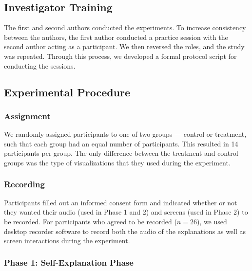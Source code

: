 \documentclass[conference]{IEEEtran}
\begin{document}
\subsection{Investigator Training}

The first and second authors conducted the experiments. To increase consistency between the authors, the first author conducted a practice session with the second author acting as a participant. We then reversed the roles, and the study was repeated. Through this process, we developed a formal protocol script for conducting the sessions.

\subsection{Experimental Procedure}


\subsubsection{Assignment}
We randomly assigned participants to one of two groups --- control or treatment, such that each group had an equal number of participants. This resulted in 14 participants per group. The only difference between the treatment and control groups was the type of visualizations that they used during the experiment.

\subsubsection{Recording}
Participants filled out an informed consent form and indicated whether or not they wanted their audio (used in Phase 1 and 2) and screens (used in Phase 2) to be recorded. For participants who agreed to be recorded ($n=26$), we used desktop recorder software to record both the audio of the explanations as well as screen interactions during the experiment.

\subsubsection{Phase 1: Self-Explanation Phase}

\end{document}
